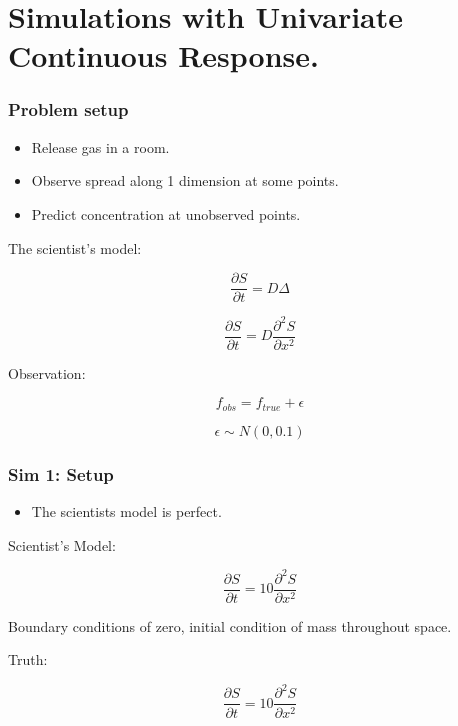 \documentclass{beamer}
\begin{document}
	\section[Section]{Simulations with Univariate Continuous Response.}
	
	\begin{frame}
		\frametitle{Problem setup}
		
		\begin{itemize}
			\item Release gas in a room. 
			\item Observe spread along 1 dimension at some points.
			\item Predict concentration at unobserved points.
		\end{itemize}
		
		The scientist's model:
		
		$$\frac{\partial S}{\partial t} = D \Delta$$
		
		$$\frac{\partial S}{\partial t} = D \frac{\partial^2 S}{\partial x^2}$$
		
		Observation:
		
		$$f_{obs} = f_{true} + \epsilon$$
		
		$$\epsilon \sim N(0,0.1)$$
		
	\end{frame}
	
	\begin{frame}
		\frametitle{Sim 1: Setup}
		
		\begin{itemize}
			\item The scientists model is perfect.
		\end{itemize}
		
		Scientist's Model:
		
		$$\frac{\partial S}{\partial t} = 10 \frac{\partial^2 S}{\partial x^2}$$
		
		Boundary conditions of zero, initial condition of mass throughout space.
		\vspace{1em}
		
		Truth:
		
		$$\frac{\partial S}{\partial t} = 10 \frac{\partial^2 S}{\partial x^2}$$
		
	\end{frame}
	
\end{document}
